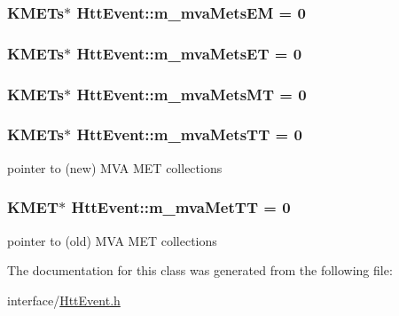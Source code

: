 \label{classHttEvent_a325b2774a25fd9898dd4ed29dae04871}
\hypertarget{classHttEvent_aa2d80544d49b539aea153ed9126643ce}{
\subsubsection[{m\_\-mvaMetsEM}]{\setlength{\rightskip}{0pt plus 5cm}KMETs$\ast$ {\bf HttEvent::m\_\-mvaMetsEM} = 0}}
\label{classHttEvent_aa2d80544d49b539aea153ed9126643ce}
\hypertarget{classHttEvent_a0ce8ee3c61b3b8b8b7b48174116b9274}{
\subsubsection[{m\_\-mvaMetsET}]{\setlength{\rightskip}{0pt plus 5cm}KMETs$\ast$ {\bf HttEvent::m\_\-mvaMetsET} = 0}}
\label{classHttEvent_a0ce8ee3c61b3b8b8b7b48174116b9274}
\hypertarget{classHttEvent_a4ee315cb90481baacb4ca22de7d98195}{
\subsubsection[{m\_\-mvaMetsMT}]{\setlength{\rightskip}{0pt plus 5cm}KMETs$\ast$ {\bf HttEvent::m\_\-mvaMetsMT} = 0}}
\label{classHttEvent_a4ee315cb90481baacb4ca22de7d98195}
\hypertarget{classHttEvent_a5a9182d2a929b51f43cd17597695308f}{
\subsubsection[{m\_\-mvaMetsTT}]{\setlength{\rightskip}{0pt plus 5cm}KMETs$\ast$ {\bf HttEvent::m\_\-mvaMetsTT} = 0}}
\label{classHttEvent_a5a9182d2a929b51f43cd17597695308f}


pointer to (new) MVA MET collections \hypertarget{classHttEvent_a310f3609ddc213111401235740b14d68}{
\subsubsection[{m\_\-mvaMetTT}]{\setlength{\rightskip}{0pt plus 5cm}KMET$\ast$ {\bf HttEvent::m\_\-mvaMetTT} = 0}}
\label{classHttEvent_a310f3609ddc213111401235740b14d68}


pointer to (old) MVA MET collections 

The documentation for this class was generated from the following file:\begin{DoxyCompactItemize}
\item 
interface/\hyperlink{HttEvent_8h}{HttEvent.h}\end{DoxyCompactItemize}
